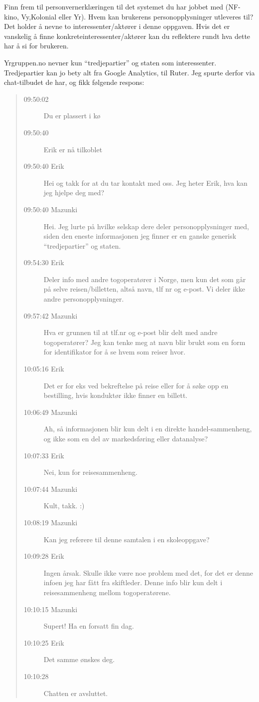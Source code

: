 \documentclass{../../myassignment}
\begin{document}
	\begin{problem}
		Finn frem til personvernerklæringen til det systemet du har jobbet med (NF-kino, Vy,Kolonial eller Yr). Hvem kan brukerens personopplysninger utleveres til? Det holder å nevne to interessenter/aktører i denne oppgaven. Hvis det er vanskelig å finne konkreteinteressenter/aktører kan du reflektere rundt hva dette har å si for brukeren.
	\end{problem}

	\begin{answer}
		Yrgruppen.no nevner kun ``tredjepartier'' og staten som interessenter. Tredjepartier kan jo bety alt fra Google Analytics, til Ruter. Jeg spurte derfor via chat-tilbudet de har, og fikk følgende respons: 

			\begin{quote}
				\begin{description}
					\item [09:50:02] Du er plassert i kø
					\item [09:50:40] Erik er nå tilkoblet
					\item [09:50:40 Erik] Hei og takk for at du tar kontakt med oss. Jeg heter Erik, hva kan jeg hjelpe deg med?
					\item [09:50:40 Mazunki] Hei. Jeg lurte på hvilke selskap dere deler personopplysninger med, siden den eneste informasjonen jeg finner er en ganske generisk ``tredjepartier'' og staten.
					\item [09:54:30 Erik] Deler info med andre togoperatører i Norge, men kun det som går på selve reisen/billetten, altså navn, tlf nr og e-post. Vi deler ikke andre personopplysninger.
					\item [09:57:42 Mazunki] Hva er grunnen til at tlf.nr og e-post blir delt med andre togoperatører? Jeg kan tenke meg at navn blir brukt som en form for identifikator for å se hvem som reiser hvor.
					\item [10:05:16 Erik] Det er for eks ved bekreftelse på reise eller for å søke opp en bestilling, hvis konduktør ikke finner en billett.
					\item [10:06:49 Mazunki] Ah, så informasjonen blir kun delt i en direkte handel-sammenheng, og ikke som en del av markedsføring eller datanalyse?
					\item [10:07:33 Erik] Nei, kun for reisesammenheng.
					\item [10:07:44 Mazunki] Kult, takk. :)
					\item [10:08:19 Mazunki] Kan jeg referere til denne samtalen i en skoleoppgave?
					\item [10:09:28 Erik] Ingen årsak. Skulle ikke være noe problem med det, for det er denne infoen jeg har fått fra skiftleder. Denne info blir kun delt i reisesammenheng mellom togoperatørene.
					\item [10:10:15 Mazunki] Supert! Ha en forsatt fin dag.
					\item [10:10:25 Erik] Det samme ønskes deg.
					\item [10:10:28] Chatten er avsluttet.
				\end{description}
			\end{quote}

	\end{answer}
\end{document}
